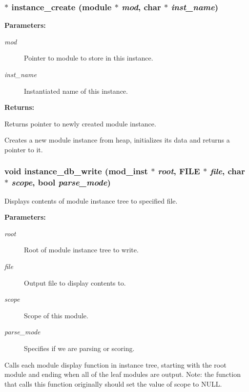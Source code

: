 \subsubsection{ $\ast$ instance\_\-create ({\bf module} $\ast$ {\em mod}, char $\ast$ {\em inst\_\-name})}\label{instance_8c_a0}


\begin{Desc}
\item[{\bf Parameters: }]\par
\begin{description}
\item[
{\em mod}]Pointer to module to store in this instance. \item[
{\em inst\_\-name}]Instantiated name of this instance.

\end{description}
\end{Desc}
\begin{Desc}
\item[{\bf Returns: }]\par
Returns pointer to newly created module instance.

\end{Desc}
Creates a new module instance from heap, initializes its data and returns a pointer to it. 
\subsubsection{\setlength{\rightskip}{0pt plus 5cm}void instance\_\-db\_\-write ({\bf mod\_\-inst} $\ast$ {\em root}, FILE $\ast$ {\em file}, char $\ast$ {\em scope}, {\bf bool} {\em parse\_\-mode})}\label{instance_8c_a10}


Displays contents of module instance tree to specified file.

\begin{Desc}
\item[{\bf Parameters: }]\par
\begin{description}
\item[
{\em root}]Root of module instance tree to write. \item[
{\em file}]Output file to display contents to. \item[
{\em scope}]Scope of this module. \item[
{\em parse\_\-mode}]Specifies if we are parsing or scoring.

\end{description}
\end{Desc}
Calls each module display function in instance tree, starting with the root module and ending when all of the leaf modules are output. Note: the function that calls this function originally should set the value of scope to NULL. 
